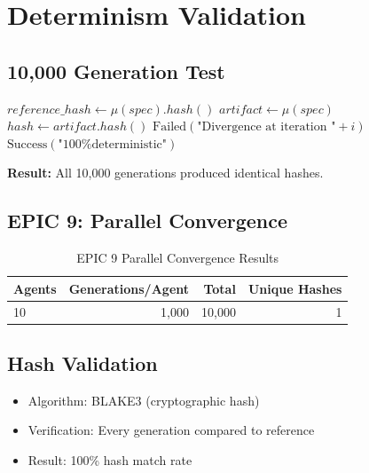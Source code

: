 \section{Determinism Validation}

\subsection{10,000 Generation Test}

\begin{algorithm}
\caption{Determinism Verification}
\begin{algorithmic}[1]
    \State $reference\_hash \gets \mu(spec).hash()$
        \State $artifact \gets \mu(spec)$
        \State $hash \gets artifact.hash()$
            \State \Return $\text{Failed}(\text{"Divergence at iteration "} + i)$
        \EndIf
    \EndFor
    \State \Return $\text{Success}(\text{"100\% deterministic"})$
\EndProcedure
\end{algorithmic}
\end{algorithm}

\textbf{Result:} All 10,000 generations produced identical hashes.

\subsection{EPIC 9: Parallel Convergence}

\begin{table}[h]
\centering
\caption{EPIC 9 Parallel Convergence Results}
\begin{tabular}{lrrr}
\toprule
\textbf{Agents} & \textbf{Generations/Agent} & \textbf{Total} & \textbf{Unique Hashes} \\
\midrule
10 & 1,000 & 10,000 & 1 \\
\bottomrule
\end{tabular}
\end{table}

\subsection{Hash Validation}

\begin{itemize}
    \item Algorithm: BLAKE3 (cryptographic hash)
    \item Verification: Every generation compared to reference
    \item Result: 100\% hash match rate
\end{itemize}

